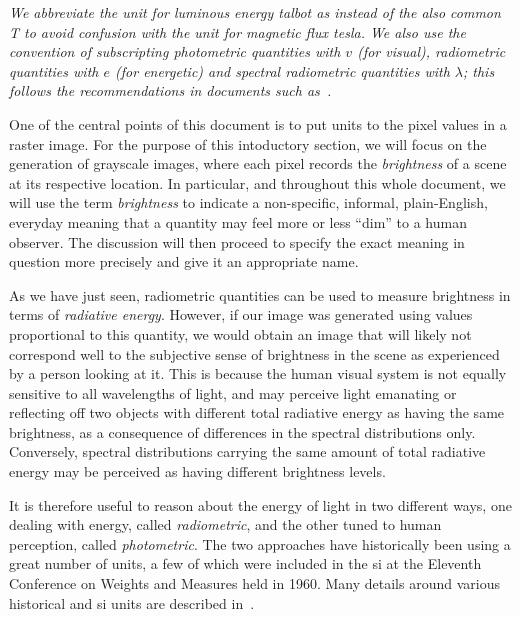 \begin{table}
{}
\vskip 1mm
{\footnotesize\it We abbreviate the unit for luminous energy \textit{talbot} as
\si{\talbot} instead of the also common \si{\tesla} to avoid confusion with the
unit for magnetic flux \textit{tesla}.
We also use the convention of subscripting photometric quantities
with $v$ (for \textit{visual}), radiometric quantities with $e$ (for
\textit{energetic}) and spectral radiometric quantities with $\lambda$;
this follows the recommendations in documents such as~\cite{united1967usa}.}
\end{table}

One of the central points of this document is to put units to the pixel
values in a raster image. 
For the purpose of this intoductory section, we will focus on the generation of grayscale images, where each pixel records the \textsl{\gls{brightness}} of a scene at its respective location. In particular, and throughout this whole document, we will use the term \textsl{brightness} to indicate a non-specific, informal, plain-English, everyday meaning that a quantity may feel more or less ``dim'' to a human observer. 
The discussion will then proceed to specify the exact meaning in question more precisely and give it an appropriate name.

As we have just seen, radiometric quantities can be used to measure brightness in terms of \emph{radiative energy}.
However, if our image was generated using values proportional to this quantity,
we would obtain an image that will likely not correspond well to the subjective sense of brightness in the scene as experienced by a person looking at it. 
This is because the human visual system is not equally sensitive to all wavelengths
of light, and may perceive light emanating or reflecting off two objects with different total radiative energy as having the same brightness, as a consequence of differences in the spectral distributions only. 
Conversely, spectral distributions carrying the same amount
of total radiative energy may be perceived as having different brightness levels.

It is therefore useful to reason about the energy of light in two
different ways, one dealing with energy, called \textsl{radiometric}, and the
other tuned to human perception, called \textsl{photometric}. The two approaches
have historically been using a great number of units, a few of which were
included in the \gls{si} at the Eleventh Conference on Weights and Measures
held in 1960.  Many details around various historical and \gls{si} units are
described in~\cite{Meyer-Arendt:68}.

